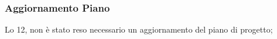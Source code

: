 \subsubsection{Aggiornamento Piano}
\label{sec:aggiornamento_piano_sprint12}
Lo  12, non è stato reso necessario un aggiornamento del piano di progetto; 

